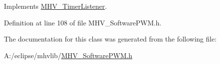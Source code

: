 Implements \hyperlink{class_m_h_v___timer_listener_a27e243f8df77035eca626beab5b3e60a}{M\-H\-V\-\_\-\-Timer\-Listener}.



Definition at line 108 of file M\-H\-V\-\_\-\-Software\-P\-W\-M.\-h.



The documentation for this class was generated from the following file\-:\begin{DoxyCompactItemize}
\item 
A\-:/eclipse/mhvlib/\hyperlink{_m_h_v___software_p_w_m_8h}{M\-H\-V\-\_\-\-Software\-P\-W\-M.\-h}\end{DoxyCompactItemize}
